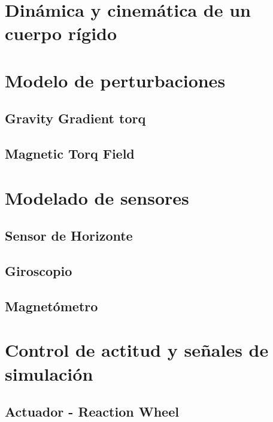 \section{Dinámica y cinemática de un cuerpo rígido}



\section{Modelo de perturbaciones}
	\subsection{Gravity Gradient torq}
	\subsection{Magnetic Torq Field}
	

\section{Modelado de sensores}
\subsection{Sensor de Horizonte}
\subsection{Giroscopio}
\subsection{Magnetómetro}


\section{Control de actitud y señales de simulación}


\subsection{Actuador - Reaction Wheel}







